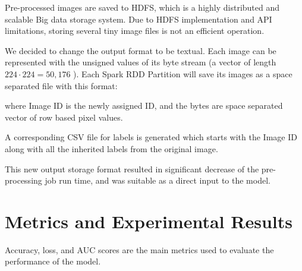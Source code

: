 \documentclass{amia}
\begin{document}
Pre-processed images are saved to HDFS, which is a highly distributed and scalable Big data storage system. Due to HDFS implementation and API limitations, storing several tiny image files is not an efficient operation.

We decided to change the output format to be textual. Each image can be represented with the unsigned values of its byte stream (a vector of length $224\cdot224=50,176$ ). Each Spark RDD Partition will save its images as a space separated file with this format:


where Image ID is the newly assigned ID, and the bytes are space separated vector of row based pixel values.

A corresponding CSV file for labels is generated which starts with the Image ID along with all the inherited labels from the original image.

This new output storage format resulted in significant decrease of the pre-processing job run time, and was suitable as a direct input to the model.



\section*{Metrics and Experimental Results}
Accuracy, loss, and AUC scores are the main metrics used to evaluate the performance of the model.
\end{document}
